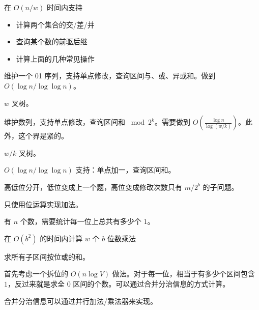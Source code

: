 \begin{example}[bitset]
    在 $O(n/w)$ 时间内支持
    \begin{itemize}
        \item 计算两个集合的交/差/并
        \item 查询某个数的前驱后继
        \item 计算上面的几种常见操作
    \end{itemize}
\end{example}


\begin{example}[维护 01 序列]
    维护一个 01 序列，支持单点修改，查询区间与、或、异或和。做到 $O(\log n/\log\log n)$。
\end{example}
\begin{solution}
    $w$ 叉树。
\end{solution}

\begin{example}
    维护数列，支持单点修改，查询区间和 $\bmod 2^k$。需要做到 $O(\frac{\log n}{\log (w/k)})$。此外，这个界是紧的。
\end{example}
\begin{solution}
    $w/k$ 叉树。
\end{solution}
\begin{example}
    $O(\log n/\log\log n)$ 支持：单点加一，查询区间和。
\end{example}
\begin{solution}
    高低位分开，低位变成上一个题，高位变成修改次数只有 $m/2^b$ 的子问题。
\end{solution}

\begin{example}[加法电路]
    只使用位运算实现加法。
\end{example}
\begin{example}[并行加法器]
    有 $n$ 个数，需要统计每一位上总共有多少个 $1$。
\end{example}
\begin{exercise}[并行乘法器]
    在 $O(b^2)$ 的时间内计算 $w$ 个 $b$ 位数乘法
\end{exercise}

\begin{example}[第七学区]
    求所有子区间按位或的和。
\end{example}
\begin{solution}
    首先考虑一个拆位的 $O(n\log V)$ 做法。对于每一位，相当于有多少个区间包含 $1$，反过来就是求全 $0$ 区间的个数。可以通过合并分治信息的方式计算。

    合并分治信息可以通过并行加法/乘法器来实现。
\end{solution}
